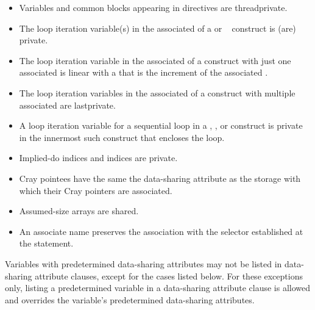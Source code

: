 \fortranspecificstart
\begin{itemize}
\item Variables and common blocks appearing in  directives are 
threadprivate. 

\item The loop iteration variable(s) in the associated  of a  or ~ 
construct is (are) private. 

\item The loop iteration variable in the associated  of a  construct with just 
one associated  is linear with a  that is the increment of 
the associated .

\item The loop iteration variables in the associated  of a  construct with 
multiple associated  are lastprivate. 

\item A loop iteration variable for a sequential loop in a , , or  construct is 
private in the innermost such construct that encloses the loop.

\item Implied-do indices and  indices are private. 

\item Cray pointees have the same the data-sharing attribute as the storage with which their Cray 
pointers are associated.

\item Assumed-size arrays are shared.
\nopagebreak
\item An associate name preserves the association with the selector established at the 
 statement.
\end{itemize}
\fortranspecificend

Variables with predetermined data-sharing attributes may not be listed in data-sharing 
attribute clauses, except for the cases listed below. For these exceptions only, listing a 
predetermined variable in a data-sharing attribute clause is allowed and overrides the 
variable's predetermined data-sharing attributes.

